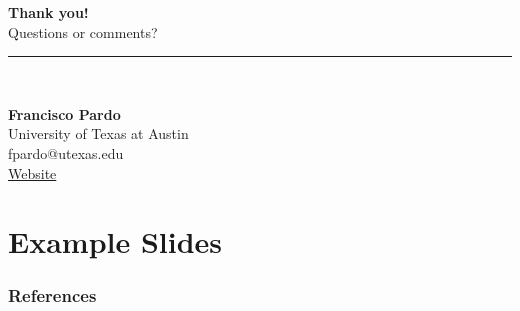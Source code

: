 \documentclass{beamer}
\begin{document}
\begin{frame}
    \hypersetup{citecolor=blue}
  \centering
  \vspace{2cm}
  {\Huge \textbf{Thank you!}} \\[1cm]
  
  {\Large Questions or comments?} \\[0.5cm]
  
  \rule{0.4\linewidth}{0.4pt} \\[0.5cm]
  
  \begin{flushleft}
    \textbf{Francisco Pardo} \\
    University of Texas at Austin \\
    fpardo@utexas.edu \\
    \href{https://francisco-pardo-pajuelo.github.io/}{Website}
  \end{flushleft}

\end{frame}

\section{Example Slides}





\begin{frame}[allowframebreaks]
    \frametitle{References}
    \small
    \tiny  %
\end{frame}
\end{document}
